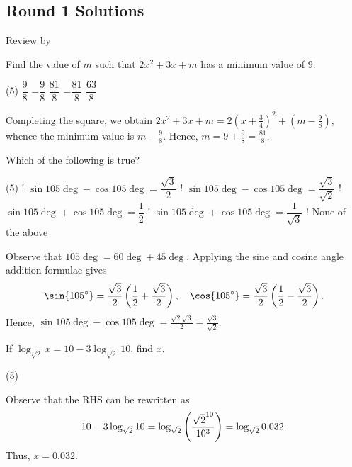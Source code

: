 \subsection{Round 1 Solutions}\label{S::2023-S-1}

\begin{resources}
    Review by 
\end{resources}

\begin{question}[C]\label{Q::2023-S-1-1}
    Find the value of $m$ such that $2x^2 + 3x + m$ has a minimum value of 9.
    \begin{tasks}(5)
        \task $\dfrac98$
        \task $-\dfrac98$
        \task $\dfrac{81}8$
        \task $-\dfrac{81}{8}$
        \task $\dfrac{63}{8}$
    \end{tasks}
\end{question}
\begin{solution*}
    Completing the square, we obtain $2x^2 + 3x + m = 2(x + \frac34)^2 + (m - \frac98)$, whence the minimum value is $m - \frac98$. Hence, $m = 9 + \frac98 = \frac{81}{8}$.
\end{solution*}

\begin{question}[B]\label{Q::2023-S-1-2}
    Which of the following is true?
    \begin{tasks}(5)
        \task! $\sin{105\deg} - \cos{105}\deg = \dfrac{\sqrt3}{2}$
        \task! $\sin{105\deg} - \cos{105}\deg = \dfrac{\sqrt3}{\sqrt2}$
        \task! $\sin{105\deg} + \cos{105}\deg = \dfrac12$
        \task! $\sin{105\deg} + \cos{105}\deg = \dfrac1{\sqrt3}$
        \task! None of the above
    \end{tasks}
\end{question}
\begin{solution*}
    Observe that $105\deg = 60\deg + 45\deg$. Applying the sine and cosine angle addition formulae gives \[\sin{105\deg} = \frac{\sqrt3}{2}\bp{\frac12 + \frac{\sqrt3}{2}}, \quad \cos{105\deg} = \frac{\sqrt3}{2}\bp{\frac12 - \frac{\sqrt3}{2}}.\] Hence, $\sin{105\deg} - \cos{105}\deg = \frac{\sqrt2 \sqrt3}{2} = \frac{\sqrt3}{\sqrt2}$.
\end{solution*}

\clearpage
\begin{question}[B]\label{Q::2023-S-1-3}
    If $\log_{\sqrt2} x = 10 - 3\log_{\sqrt2} 10$, find $x$.
    \begin{tasks}(5)
    \end{tasks}
\end{question}
\begin{solution*}
    Observe that the RHS can be rewritten as \[10 - 3\log_{\sqrt2} 10 = \log_{\sqrt2}\left( \frac{{\sqrt2}^{10}}{10^3} \right) = \log_{\sqrt2} 0.032.\] Thus, $x = 0.032$.
\end{solution*}

